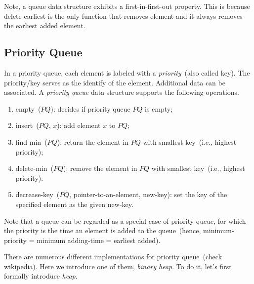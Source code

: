 \begin{algorithmblock}[0.8\textwidth]
	\xxx
	\xxx
\end{algorithmblock}

\begin{algorithmblock}[0.8\textwidth]
	\xxx
	\xxx
	\xxx
\end{algorithmblock}

Note, a queue data structure exhibits a first-in-first-out property.
This is because delete-earliest is the only function that removes element and
it always removes the earliest added element. %

\subsection*{Priority Queue}

In a priority queue, each element is labeled with a \emph{priority}~(also called key).
The priority/key serves as the identify of the element.
Additional data can be associated.
A \emph{priority queue} data structure supports the following operations.
\begin{enumerate}
\item empty~($PQ$): decides if priority queue $PQ$ is empty;
\item insert~($PQ$, $x$): add element $x$ to $PQ$;
\item find-min~($PQ$): return the element in $PQ$ with smallest key~(i.e., highest priority);
\item delete-min~($PQ$): remove the element in $PQ$ with smallest key~(i.e., highest priority).
\item decrease-key~($PQ$, pointer-to-an-element, new-key): set the key of the specified element as the given new-key.
\end{enumerate}

Note that a queue can be regarded as a special case of priority queue, for which the priority
is the time an element is added to the queue~(hence, minimum-priority = minimum adding-time = earliest added).

There are numerous different implementations for priority queue~(check wikipedia). 
Here we introduce one of them, \emph{binary heap}. To do it, let's first
formally introduce \emph{heap}.

